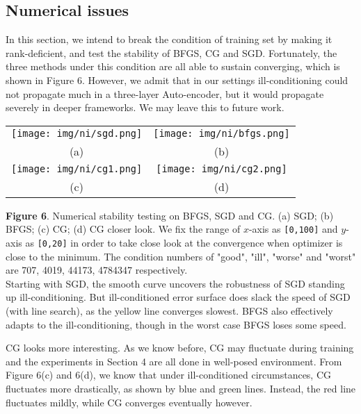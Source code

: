\documentclass{article} %
\begin{document}
\subsection{Numerical issues} In this section, we intend to break the condition of training set by making it rank-deficient, and test the stability of BFGS, CG and SGD. Fortunately, the three methods under this condition are all able to sustain converging, which is shown in Figure 6. However, we admit that in our settings ill-conditioning could not propagate much in a three-layer Auto-encoder, but it would propagate severely in deeper frameworks. We may leave this to future work.
\begin{tabular}{cc}
    \texttt{[image: img/ni/sgd.png]}  & \texttt{[image: img/ni/bfgs.png]} \\
    (a) & (b) \\
    \texttt{[image: img/ni/cg1.png]}  & \texttt{[image: img/ni/cg2.png]} \\
    (c) & (d) \\
\end{tabular}
{\bf Figure 6}. Numerical stability testing on BFGS, SGD and CG. (a) SGD; (b) BFGS; (c) CG; (d) CG closer look. We fix the range of $x$-axis as \texttt{[0,100]} and $y$-axis as \texttt{[0,20]} in order to take close look at the convergence when optimizer is close to the minimum. The condition numbers of "good", "ill", "worse" and "worst" are 707, 4019, 44173, 4784347 respectively. \\

Starting with SGD, the smooth curve uncovers the robustness of SGD standing up ill-conditioning. But ill-conditioned error surface does slack the speed of SGD (with line search), as the yellow line converges slowest. BFGS also effectively adapts to the ill-conditioning, though in the worst case BFGS loses some speed.

CG looks more interesting. As we know before, CG may fluctuate during training and the experiments in Section 4 are all done in well-posed environment. From Figure 6(c) and 6(d), we know that under ill-conditioned circumstances, CG fluctuates more drastically, as shown by blue and green lines. Instead, the red line fluctuates mildly, while CG converges eventually however. 
\end{document}
